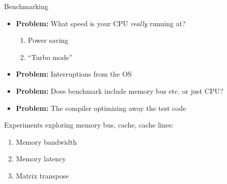 \documentclass[sans,mathserif]{beamer}
\begin{document}
\begin{frame}{Benchmarking}

\begin{itemize}
\item<+-> {\bf Problem:} What speed is your CPU {\em really} running at?
  \begin{enumerate}
  \item Power saving
  \item ``Turbo mode''
  \end{enumerate}
\vspace{0.2cm}
\vspace{0.5cm}

\item<+-> {\bf Problem:} Interruptions from the OS\\
\vspace{0.2cm}
\vspace{0.5cm}

\item<+-> {\bf Problem:} Does benchmark include memory bus etc. or just CPU? \\
\vspace{0.5cm}

\item<+-> {\bf Problem:} The compiler optimizing away the test code

\end{itemize}

\end{frame}

\begin{frame}
Experiments exploring memory bus, cache, cache lines:
\begin{enumerate}
\item<+-> Memory bandwidth
\item<+-> Memory latency
\item<+-> Matrix transpose
\end{enumerate}
\end{frame}
\end{document}
